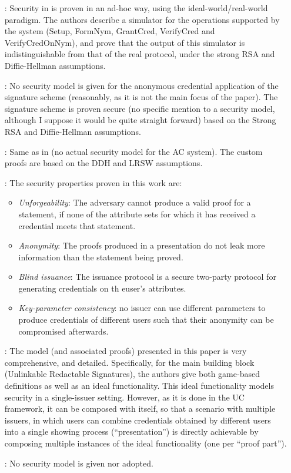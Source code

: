 \begin{enumerate}
\item[\cite{cl01}:] Security in \cite{cl01} is proven in an ad-hoc way,
  using the ideal-world/real-world paradigm. The authors describe a
  simulator for the operations supported by the system (Setup, FormNym,
  GrantCred, VerifyCred and VerifyCredOnNym), and prove that the output of this
  simulator is indistinguishable from that of the real protocol, under the
  strong RSA and Diffie-Hellman assumptions.  
\item[\cite{cl02}:] No security model is given for the anonymous credential
  application of the signature scheme (reasonably, as it is not the main focus
  of the paper). The signature scheme is proven secure (no specific mention
  to a security model, although I suppose it would be quite straight forward)
  based on the Strong RSA and Diffie-Hellman assumptions.
\item[\cite{cl04}:] Same as in \cite{cl02} (no actual security model for the
  AC system). The custom proofs are based on the DDH and LRSW assumptions.
\item[\cite{cmz14}:] The security properties proven in this work are:
  \begin{itemize}
  \item \emph{Unforgeability}: The adversary cannot produce a valid proof for a
    statement, if none of the attribute sets for which it has received a
    credential meets that statement.
  \item \emph{Anonymity}: The proofs produced in a presentation do not leak
    more information than the statement being proved.
  \item \emph{Blind issuance}: The issuance protocol is a secure two-party
    protocol for generating credentials on th euser's attributes.
  \item \emph{Key-parameter consistency}: no issuer can use different parameters
    to produce credentials of different users such that their anonymity can
    be compromised afterwards. 
  \end{itemize}
\item[\cite{cdhk15}:] The model (and associated proofs) presented in this paper
  is very comprehensive, and detailed. Specifically, for the main building block
  (Unlinkable Redactable Signatures), the authors give both game-based
  definitions as well as an ideal functionality. This ideal functionality models
  security in a single-issuer setting. However, as it is done in the UC
  framework, it can be composed with itself, so that a scenario with multiple
  issuers, in which users can combine credentials obtained by different users
  into a single showing process (``presentation'') is directly achievable by
  composing multiple instances of the ideal functionality (one per ``proof
  part'').
\item[\cite{sms+19}:] No security model is given nor adopted.
\end{enumerate}

